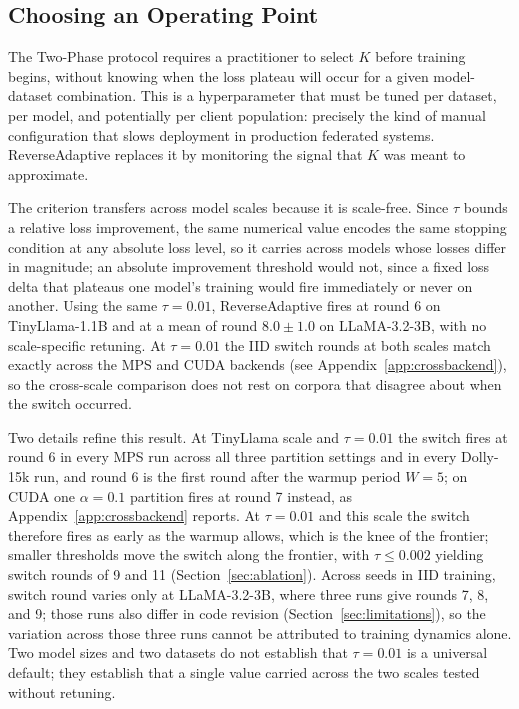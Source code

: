 \subsection{Choosing an Operating Point}
\label{sec:choosing}
The Two-Phase protocol requires a practitioner to select $K$ before training begins, without knowing when the loss plateau will occur for a given model-dataset combination. This is a hyperparameter that must be tuned per dataset, per model, and potentially per client population: precisely the kind of manual configuration that slows deployment in production federated systems. ReverseAdaptive replaces it by monitoring the signal that $K$ was meant to approximate.

The criterion transfers across model scales because it is scale-free. Since $\tau$ bounds a relative loss improvement, the same numerical value encodes the same stopping condition at any absolute loss level, so it carries across models whose losses differ in magnitude; an absolute improvement threshold would not, since a fixed loss delta that plateaus one model's training would fire immediately or never on another. Using the same $\tau{=}0.01$, ReverseAdaptive fires at round 6 on TinyLlama-1.1B and at a mean of round $8.0 \pm 1.0$ on LLaMA-3.2-3B, with no scale-specific retuning. At $\tau{=}0.01$ the IID switch rounds at both scales match exactly across the MPS and CUDA backends (see Appendix~\ref{app:crossbackend}), so the cross-scale comparison does not rest on corpora that disagree about when the switch occurred.

Two details refine this result. At TinyLlama scale and $\tau{=}0.01$ the switch fires at round 6 in every MPS run across all three partition settings and in every Dolly-15k run, and round 6 is the first round after the warmup period $W{=}5$; on CUDA one $\alpha{=}0.1$ partition fires at round 7 instead, as Appendix~\ref{app:crossbackend} reports. At $\tau{=}0.01$ and this scale the switch therefore fires as early as the warmup allows, which is the knee of the frontier; smaller thresholds move the switch along the frontier, with $\tau \leq 0.002$ yielding switch rounds of 9 and 11 (Section~\ref{sec:ablation}). Across seeds in IID training, switch round varies only at LLaMA-3.2-3B, where three runs give rounds 7, 8, and 9; those runs also differ in code revision (Section~\ref{sec:limitations}), so the variation across those three runs cannot be attributed to training dynamics alone. Two model sizes and two datasets do not establish that $\tau{=}0.01$ is a universal default; they establish that a single value carried across the two scales tested without retuning.


